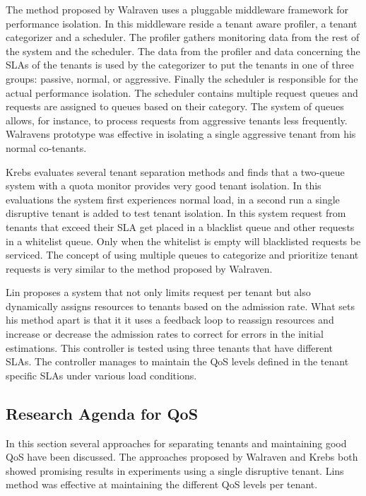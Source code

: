 The method proposed by Walraven uses a pluggable middleware framework for performance isolation.
In this middleware reside a tenant aware profiler, a tenant categorizer and a scheduler. 
The profiler gathers monitoring data from the rest of the system and the scheduler.
The data from the profiler and data concerning the \acp{SLA} of the tenants is used by the categorizer to put the tenants in one of three groups: passive, normal, or aggressive.
Finally the scheduler is responsible for the actual performance isolation.
The scheduler contains multiple request queues and requests are assigned to queues based on their category.
The system of queues allows, for instance, to process requests from aggressive tenants less frequently.
Walravens prototype was effective in isolating a single aggressive tenant from his normal co-tenants.

Krebs evaluates several tenant separation methods and finds that a two-queue system with a quota monitor provides very good tenant isolation.
In this evaluations the system first experiences normal load, in a second run a single disruptive tenant is added to test tenant isolation.
In this system request from tenants that exceed their \ac{SLA} get placed in a blacklist queue and other requests in a whitelist queue. 
Only when the whitelist is empty will blacklisted requests be serviced.
The concept of using multiple queues to categorize and prioritize tenant requests is very similar to the method proposed by Walraven.

Lin proposes a system that not only limits request per tenant but also dynamically assigns resources to tenants based on the admission rate.
What sets his method apart is that it it uses a feedback loop to reassign resources and increase or decrease the admission rates to correct for errors in the initial estimations.
This controller is tested using three tenants that have different \acp{SLA}. 
The controller manages to maintain the \ac{QoS} levels defined in the tenant specific \acp{SLA} under various load conditions.

\subsection{Research Agenda for \ac{QoS}}\label{sec:qos_agenda}
In this section several approaches for separating tenants and maintaining good \ac{QoS} have been discussed.
The approaches proposed by Walraven and Krebs both showed promising results in experiments using a single disruptive tenant.
Lins method was effective at maintaining the different \ac{QoS} levels per tenant.

